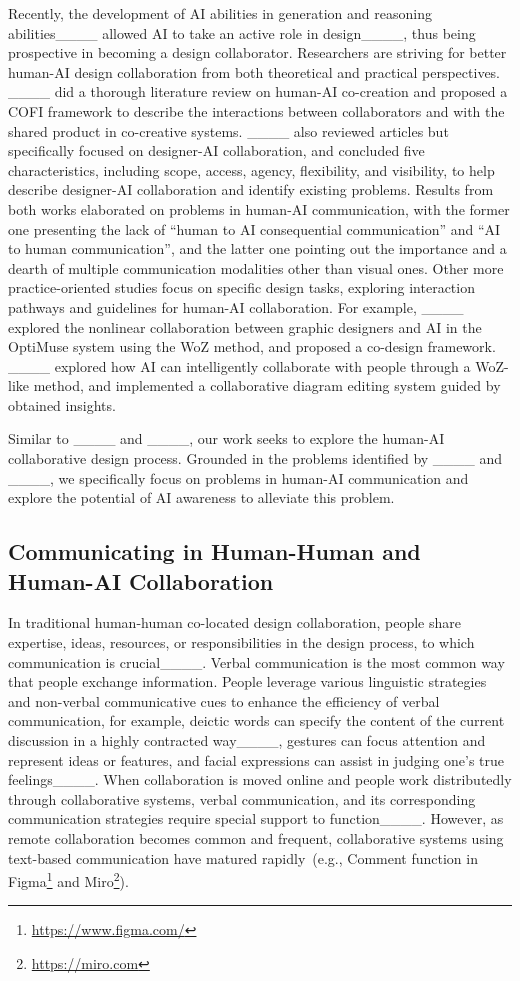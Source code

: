 Recently, the development of AI abilities in generation and reasoning abilities____ allowed AI to take an active role in design____, thus being prospective in becoming a design collaborator. Researchers are striving for better human-AI design collaboration from both theoretical and practical perspectives. ____ did a thorough literature review on human-AI co-creation and proposed a COFI framework to describe the interactions between collaborators and with the shared product in co-creative systems. ____ also reviewed articles but specifically focused on designer-AI collaboration, and concluded five characteristics, including scope, access, agency, flexibility, and visibility, to help describe designer-AI collaboration and identify existing problems. Results from both works elaborated on problems in human-AI communication, with the former one presenting the lack of ``human to AI consequential communication'' and ``AI to human communication'', and the latter one pointing out the importance and a dearth of multiple communication modalities other than visual ones. Other more practice-oriented studies focus on specific design tasks, exploring interaction pathways and guidelines for human-AI collaboration. For example, ____ explored the nonlinear collaboration between graphic designers and AI in the OptiMuse system using the WoZ method, and proposed a co-design framework. ____ explored how AI can intelligently collaborate with people through a WoZ-like method, and implemented a collaborative diagram editing system guided by obtained insights.

Similar to ____ and ____, our work seeks to explore the human-AI collaborative design process. Grounded in the problems identified by ____ and ____, we specifically focus on problems in human-AI communication and explore the potential of AI awareness to alleviate this problem.

\subsection{Communicating in Human-Human and Human-AI Collaboration}
In traditional human-human co-located design collaboration, people share expertise, ideas, resources, or responsibilities in the design process, to which communication is crucial____. Verbal communication is the most common way that people exchange information. People leverage various linguistic strategies and non-verbal communicative cues to enhance the efficiency of verbal communication, for example, deictic words can specify the content of the current discussion in a highly contracted way____, gestures can focus attention and represent ideas or features, and facial expressions can assist in judging one's true feelings____. When collaboration is moved online and people work distributedly through collaborative systems, verbal communication, and its corresponding communication strategies require special support to function____. However, as remote collaboration becomes common and frequent, collaborative systems using text-based communication have matured rapidly~(e.g., Comment function in Figma\footnote{\url{https://www.figma.com/}} and Miro\footnote{\url{https://miro.com}}).

